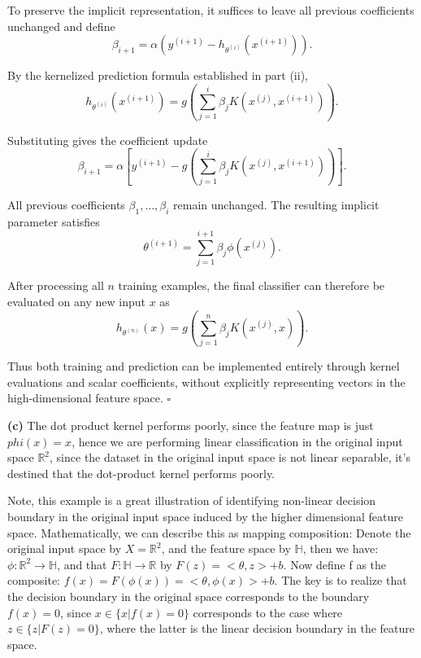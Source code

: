 \documentclass[11pt]{article}
\begin{document}
To preserve the implicit representation,
it suffices to leave all previous
coefficients unchanged and define
\[
\beta_{i+1}
=
\alpha\left(
y^{(i+1)}
-h_{\theta^{(i)}}(x^{(i+1)})
\right).
\]

By the kernelized prediction formula
established in part (ii),
\[
h_{\theta^{(i)}}(x^{(i+1)})
=
g\left(
\sum_{j=1}^{i}
\beta_jK(x^{(j)},x^{(i+1)})
\right).
\]

Substituting gives the coefficient update
\[
\boxed{
\beta_{i+1}
=
\alpha\left[
y^{(i+1)}
-
g\left(
\sum_{j=1}^{i}
\beta_jK(x^{(j)},x^{(i+1)})
\right)
\right].
}
\]

All previous coefficients
$\beta_1,\ldots,\beta_i$ remain unchanged.
The resulting implicit parameter satisfies
\[
\theta^{(i+1)}
=
\sum_{j=1}^{i+1}\beta_j\phi(x^{(j)}).
\]

After processing all $n$ training examples,
the final classifier can therefore be
evaluated on any new input $x$ as
\[
\boxed{
h_{\theta^{(n)}}(x)
=
g\left(
\sum_{j=1}^{n}
\beta_jK(x^{(j)},x)
\right).
}
\]

Thus both training and prediction can be
implemented entirely through kernel
evaluations and scalar coefficients,
without explicitly representing vectors
in the high-dimensional feature space.
\hfill$\square$

\textbf{(c)} The dot product kernel performs poorly, since the feature map is just $phi(x) = x$, hence we are performing linear classification in the original input space $\mathbb{R}^2$, since the dataset in the original input space
is not linear separable, it's destined that the dot-product kernel performs poorly.

\vspace{3mm}
Note, this example is a great illustration of identifying non-linear decision
boundary in the original input space induced by the higher dimensional feature space.
Mathematically, we can describe this as mapping composition: Denote the original input space by $X = \mathbb{R}^2$, 
and the feature space by $\mathbb{H}$, then we have: $\phi: \mathbb{R}^2 \to \mathbb{H}$, and that $F: \mathbb{H} \to \mathbb{R}$ by $F(z) = <\theta, z> + b$. 
Now define f as the composite: $f(x) = F(\phi(x)) = <\theta, \phi(x)> + b$. The key is to realize that the decision boundary in the original space corresponds to 
the boundary $f(x) = 0$, since $x \in \{x | f(x) = 0\}$ corresponds to the case where $z \in \{z | F(z) = 0\}$, where the latter is the linear decision boundary in the feature space.
\end{document}
